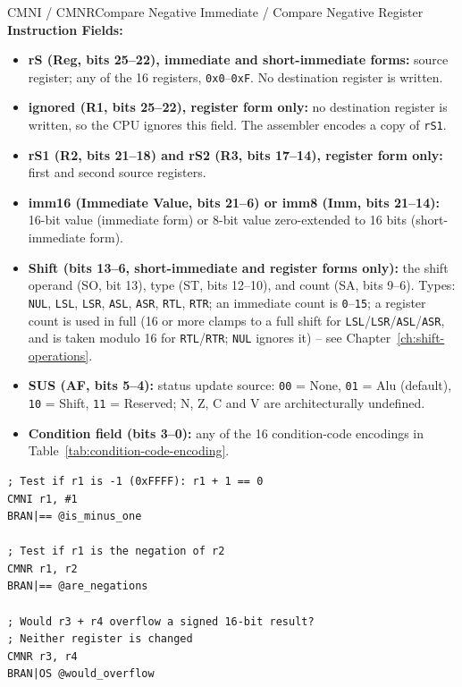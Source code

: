 \begin{instructionbox}{CMNI / CMNR}{Compare Negative Immediate / Compare Negative Register}
	\textbf{Instruction Fields:}
	\begin{itemize}
		\item \textbf{rS (Reg, bits 25--22), immediate and short-immediate forms:} source register; any of the 16 registers,
		      \texttt{0x0}--\texttt{0xF}. No destination register is written.
		\item \textbf{ignored (R1, bits 25--22), register form only:} no destination register is written, so the CPU ignores
		      this field. The assembler encodes a copy of \texttt{rS1}.
		\item \textbf{rS1 (R2, bits 21--18) and rS2 (R3, bits 17--14), register form only:} first and second source registers.
		\item \textbf{imm16 (Immediate Value, bits 21--6) or imm8 (Imm, bits 21--14):} 16-bit value (immediate form) or 8-bit
		      value zero-extended to 16 bits (short-immediate form).
		\item \textbf{Shift (bits 13--6, short-immediate and register forms only):} the shift operand (SO, bit 13), type (ST, bits 12--10), and count (SA, bits 9--6). Types:
		      \texttt{NUL}, \texttt{LSL},
		      \texttt{LSR}, \texttt{ASL}, \texttt{ASR}, \texttt{RTL}, \texttt{RTR}; an immediate count is
		      \texttt{0}--\texttt{15}; a register count is used in full (16 or more clamps to a full shift for \texttt{LSL}/\texttt{LSR}/\texttt{ASL}/\texttt{ASR}, and is taken modulo 16 for \texttt{RTL}/\texttt{RTR}; \texttt{NUL} ignores it) -- see Chapter~\ref{ch:shift-operations}.
		\item \textbf{SUS (AF, bits 5--4):} status update source: \texttt{00} = None, \texttt{01} = Alu (default), \texttt{10} = Shift, \texttt{11} =
		      Reserved; N, Z, C and V are architecturally undefined.
		\item \textbf{Condition field (bits 3--0):} any of the 16 condition-code encodings in
		      Table~\ref{tab:condition-code-encoding}.
	\end{itemize}

	\begin{example}
		\begin{lstlisting}
; Test if r1 is -1 (0xFFFF): r1 + 1 == 0
CMNI r1, #1
BRAN|== @is_minus_one

; Test if r1 is the negation of r2
CMNR r1, r2
BRAN|== @are_negations

; Would r3 + r4 overflow a signed 16-bit result?
; Neither register is changed
CMNR r3, r4
BRAN|OS @would_overflow
		\end{lstlisting}
		\caption{Testing Sums Without Writing Them}
	\end{example}


\end{instructionbox}
